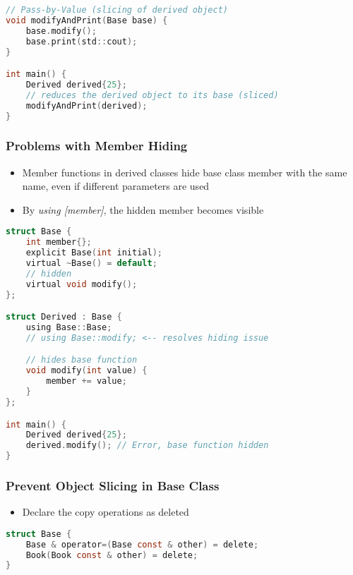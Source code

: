 \begin{lstlisting}[style=frame, style= linenumbers, language=C]
// Pass-by-Value (slicing of derived object)
void modifyAndPrint(Base base) {
    base.modify();
    base.print(std::cout);
}

int main() {
    Derived derived{25};
    // reduces the derived object to its base (sliced)
    modifyAndPrint(derived);
}
\end{lstlisting}

\pagebreak

\subsubsection{Problems with Member Hiding}
\begin{itemize}
    \item Member functions in derived classes hide base class member with the same name, even if different parameters are used
    \item By \textit{using [member]}, the hidden member becomes visible
\end{itemize}

\begin{lstlisting}[style=frame, style= linenumbers, language=C]
struct Base {
    int member{};
    explicit Base(int initial);
    virtual ~Base() = default;
    // hidden
    virtual void modify();
};

struct Derived : Base {
    using Base::Base;
    // using Base::modify; <-- resolves hiding issue

    // hides base function
    void modify(int value) {
        member += value;
    }
};

int main() {
    Derived derived{25};
    derived.modify(); // Error, base function hidden
}
\end{lstlisting}

\subsubsection{Prevent Object Slicing in Base Class}
\begin{itemize}
    \item Declare the copy operations as deleted
\end{itemize}

\begin{lstlisting}[style=frame, style= linenumbers, language=C]
struct Base {
    Base & operator=(Base const & other) = delete;
    Book(Book const & other) = delete;
}
\end{lstlisting}

